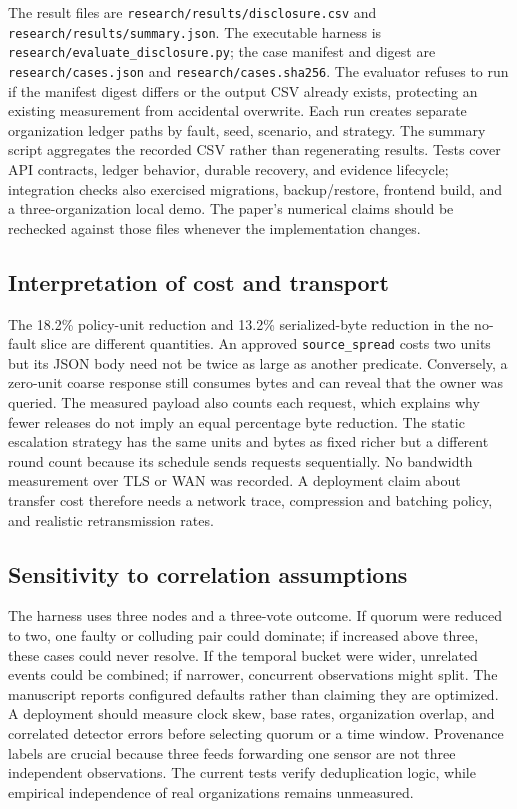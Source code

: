The result files are \texttt{research/results/disclosure.csv} and \texttt{research/results/summary.json}. The executable harness is \texttt{research/evaluate\_disclosure.py}; the case manifest and digest are \texttt{research/cases.json} and \texttt{research/cases.sha256}. The evaluator refuses to run if the manifest digest differs or the output CSV already exists, protecting an existing measurement from accidental overwrite. Each run creates separate organization ledger paths by fault, seed, scenario, and strategy. The summary script aggregates the recorded CSV rather than regenerating results. Tests cover API contracts, ledger behavior, durable recovery, and evidence lifecycle; integration checks also exercised migrations, backup/restore, frontend build, and a three-organization local demo. The paper's numerical claims should be rechecked against those files whenever the implementation changes.

\subsection{Interpretation of cost and transport}
The 18.2\% policy-unit reduction and 13.2\% serialized-byte reduction in the no-fault slice are different quantities. An approved \texttt{source\_spread} costs two units but its JSON body need not be twice as large as another predicate. Conversely, a zero-unit coarse response still consumes bytes and can reveal that the owner was queried. The measured payload also counts each request, which explains why fewer releases do not imply an equal percentage byte reduction. The static escalation strategy has the same units and bytes as fixed richer but a different round count because its schedule sends requests sequentially. No bandwidth measurement over TLS or WAN was recorded. A deployment claim about transfer cost therefore needs a network trace, compression and batching policy, and realistic retransmission rates.

\subsection{Sensitivity to correlation assumptions}
The harness uses three nodes and a three-vote outcome. If quorum were reduced to two, one faulty or colluding pair could dominate; if increased above three, these cases could never resolve. If the temporal bucket were wider, unrelated events could be combined; if narrower, concurrent observations might split. The manuscript reports configured defaults rather than claiming they are optimized. A deployment should measure clock skew, base rates, organization overlap, and correlated detector errors before selecting quorum or a time window. Provenance labels are crucial because three feeds forwarding one sensor are not three independent observations. The current tests verify deduplication logic, while empirical independence of real organizations remains unmeasured.

